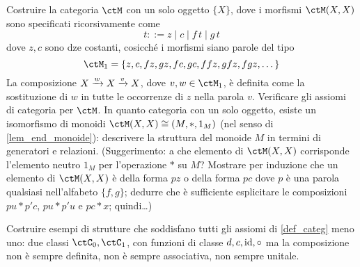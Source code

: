 \begin{esercizi}
	\item \label{jgdasoh_3} Costruire la categoria \(\ctM\) con un solo oggetto \(\{X\}\), dove i morfismi \(\Hom\ctM(X,X)\) sono specificati ricorsivamente come
	\[t ::= z \mid c \mid f \, t \mid g \, t \]
	dove \(z,c\) sono dze costanti, cosicché i morfismi siano parole del tipo
	\[\ctM_1=\{z,c,fz,gz,fc,gc,ffz,gfz,fgz,\dots\}\]
	La composizione \(X \xrightarrow{w} X \xrightarrow{v} X\), dove \(v,w\in\ctM_1\), è definita come la sostituzione di \(w\) in tutte le occorrenze di \(z\) nella parola \(v\). Verificare gli assiomi di categoria per \(\ctM\). In quanto categoria con un solo oggetto, esiste un isomorfismo di monoidi \(\ctM(X,X) \cong (M,\ast,1_M)\) (nel senso di \ref{lem_end_monoide}): descrivere la struttura del monoide \(M\) in termini di generatori e relazioni. (Suggerimento: a che elemento di \(\ctM(X,X)\) corrisponde l'elemento neutro \(1_M\) per l'operazione \(*\) su \(M\)? Mostrare per induzione che un elemento di \(\ctM(X,X)\) è della forma \(pz\) o della forma \(pc\) dove \(p\) è una parola qualsiasi nell'alfabeto \(\{f,g\}\); dedurre che è sufficiente esplicitare le composizioni \(pu * p'c\), \(pu * p'u\) e \(pc * x\); quindi\dots)
	\item \label{jgdasoh_5} Costruire esempi di strutture che soddisfano tutti gli assiomi di \ref{def_categ} meno uno: due classi \(\ctC_0,\ctC_1\), con funzioni di classe \(d,c,\mathrm{id},\circ\) ma la composizione non è sempre definita, non è sempre associativa, non sempre unitale.
\end{esercizi}

